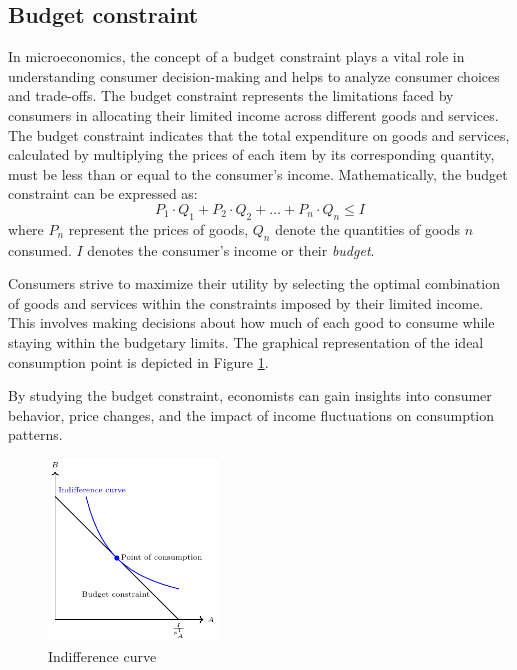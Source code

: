 \documentclass[
  12pt,
  oneside]{book}
\theoremstyle{definition}
\theoremstyle{definition}
\theoremstyle{definition}
\theoremstyle{definition}
\theoremstyle{remark}
\begin{document}
\hypertarget{budget-constraint}{%
\subsection{Budget constraint}\label{budget-constraint}}

In microeconomics, the concept of a budget constraint plays a vital role in understanding consumer decision-making and helps to analyze consumer choices and trade-offs. The budget constraint represents the limitations faced by consumers in allocating their limited income across different goods and services. The budget constraint indicates that the total expenditure on goods and services, calculated by multiplying the prices of each item by its corresponding quantity, must be less than or equal to the consumer's income.
Mathematically, the budget constraint can be expressed as:
\[
P_1 \cdot Q_1 + P_2 \cdot Q_2 + \ldots + P_n \cdot Q_n \leq I
\]
where \(P_n\) represent the prices of goods, \(Q_n\) denote the quantities of goods \(n\) consumed. \(I\) denotes the consumer's income or their \emph{budget}.

Consumers strive to maximize their utility by selecting the optimal combination of goods and services within the constraints imposed by their limited income. This involves making decisions about how much of each good to consume while staying within the budgetary limits. The graphical representation of the ideal consumption point is depicted in Figure \ref{fig:pointofconsumption}.

By studying the budget constraint, economists can gain insights into consumer behavior, price changes, and the impact of income fluctuations on consumption patterns.

\begin{figure}
\centering
\includegraphics[width=0.4\textwidth,height=\textheight]{fig/pointofconsumption.png}
\caption{\label{fig:pointofconsumption} Indifference curve}
\end{figure}
\end{document}
